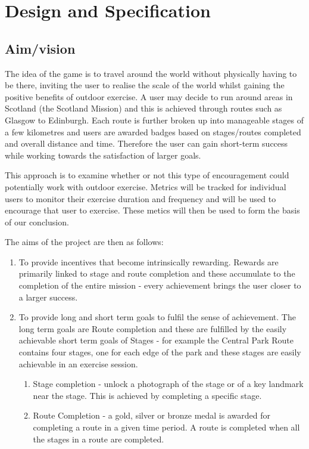 \chapter{Design and Specification}\label{ch_method}

\section{Aim/vision}

The idea of the game is to travel around the world without physically
having to be there, inviting the user to realise the scale of the
world whilst gaining the positive benefits of outdoor exercise. A user
may decide to run around areas in Scotland (the Scotland Mission) and
this is achieved through routes such as Glasgow to Edinburgh. Each
route is further broken up into manageable stages of a few kilometres
and users are awarded badges based on stages/routes completed and
overall distance and time. Therefore the user can gain short-term
success while working towards the satisfaction of larger goals. 

This approach is to examine whether or not this type of encouragement
could potentially work with outdoor exercise. Metrics will be tracked
for individual users to monitor their exercise duration and frequency
and will be used to encourage that user to exercise. These metics will
then be used to form the basis of our conclusion.

The aims of the project are then as follows:
\begin{enumerate}
  \item To provide incentives that become intrinsically
    rewarding. Rewards are primarily linked to stage and route 
    completion and these accumulate to the completion of the entire
    mission - every achievement brings the user closer to a larger
    success. 
  \item To provide long and short term goals to fulfil the sense of
    achievement. The long term goals are Route completion and these are
    fulfilled by the easily achievable short term goals of Stages -
    for example the Central Park Route contains four stages, one for
    each edge of the park and these stages are easily achievable in an
    exercise session.
    \begin{enumerate}
      \item Stage completion - unlock a photograph of the stage or of
        a key landmark near the stage. This is achieved by completing
        a specific stage.
      \item Route Completion - a gold, silver or bronze medal is
        awarded for completing a route in a given time period. A route
        is completed when all the stages in a route are completed.
    \end{enumerate}
\end{enumerate}

